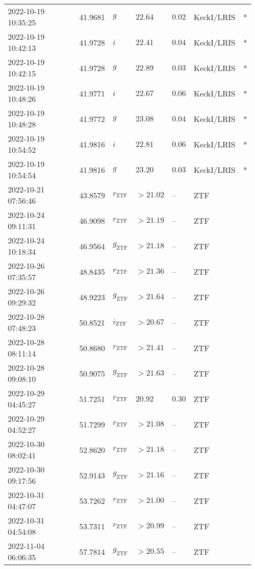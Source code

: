 \documentclass{nature_plusfigure}
\begin{document}
\begin{supplement}
\begin{center}
\begin{longtable}{lllllll}
2022-10-19 10:35:25 & 41.9681 & $g$ & $22.64$ & $0.02$ & KeckI/LRIS & * \\ 
2022-10-19 10:42:13 & 41.9728 & $i$ & $22.41$ & $0.04$ & KeckI/LRIS & * \\ 
2022-10-19 10:42:15 & 41.9728 & $g$ & $22.89$ & $0.03$ & KeckI/LRIS & * \\ 
2022-10-19 10:48:26 & 41.9771 & $i$ & $22.67$ & $0.06$ & KeckI/LRIS & * \\ 
2022-10-19 10:48:28 & 41.9772 & $g$ & $23.08$ & $0.04$ & KeckI/LRIS & * \\ 
2022-10-19 10:54:52 & 41.9816 & $i$ & $22.81$ & $0.06$ & KeckI/LRIS & * \\ 
2022-10-19 10:54:54 & 41.9816 & $g$ & $23.20$ & $0.03$ & KeckI/LRIS & * \\ 
2022-10-21 07:56:46 & 43.8579 & ${r}_\mathrm{ZTF}$ & $>21.02$ & -- & ZTF &  \\ 
2022-10-24 09:11:31 & 46.9098 & ${r}_\mathrm{ZTF}$ & $>21.19$ & -- & ZTF &  \\ 
2022-10-24 10:18:34 & 46.9564 & ${g}_\mathrm{ZTF}$ & $>21.18$ & -- & ZTF &  \\ 
2022-10-26 07:35:57 & 48.8435 & ${r}_\mathrm{ZTF}$ & $>21.36$ & -- & ZTF &  \\ 
2022-10-26 09:29:32 & 48.9223 & ${g}_\mathrm{ZTF}$ & $>21.64$ & -- & ZTF &  \\ 
2022-10-28 07:48:23 & 50.8521 & ${i}_\mathrm{ZTF}$ & $>20.67$ & -- & ZTF &  \\ 
2022-10-28 08:11:14 & 50.8680 & ${r}_\mathrm{ZTF}$ & $>21.41$ & -- & ZTF &  \\ 
2022-10-28 09:08:10 & 50.9075 & ${g}_\mathrm{ZTF}$ & $>21.63$ & -- & ZTF &  \\ 
2022-10-29 04:45:27 & 51.7251 & ${r}_\mathrm{ZTF}$ & $20.92$ & $0.30$ & ZTF &  \\ 
2022-10-29 04:52:27 & 51.7299 & ${r}_\mathrm{ZTF}$ & $>21.08$ & -- & ZTF &  \\ 
2022-10-30 08:02:41 & 52.8620 & ${r}_\mathrm{ZTF}$ & $>21.18$ & -- & ZTF &  \\ 
2022-10-30 09:17:56 & 52.9143 & ${g}_\mathrm{ZTF}$ & $>21.16$ & -- & ZTF &  \\ 
2022-10-31 04:47:07 & 53.7262 & ${r}_\mathrm{ZTF}$ & $>21.00$ & -- & ZTF &  \\ 
2022-10-31 04:54:08 & 53.7311 & ${r}_\mathrm{ZTF}$ & $>20.99$ & -- & ZTF &  \\ 
2022-11-04 06:06:35 & 57.7814 & ${g}_\mathrm{ZTF}$ & $>20.55$ & -- & ZTF &  \\ 

\end{longtable}
\end{center}
\end{supplement}
\end{document}
